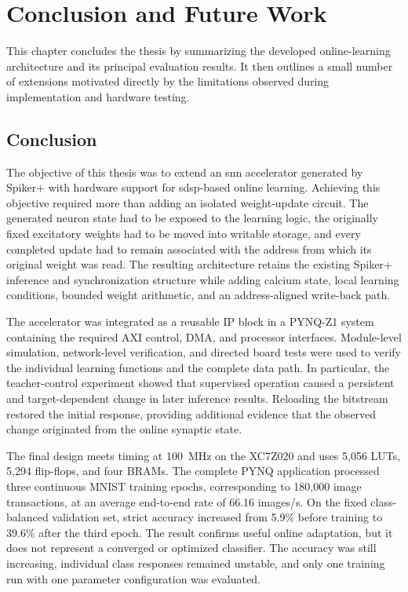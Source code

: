 \chapter{Conclusion and Future Work}
\label{sec:conclusion_and_future_work}

This chapter concludes the thesis by summarizing the developed online-learning architecture and its principal evaluation results. It then outlines a small number of extensions motivated directly by the limitations observed during implementation and hardware testing.

\section{Conclusion}

The objective of this thesis was to extend an \gls{snn} accelerator generated by Spiker+ with hardware support for \gls{sdsp}-based online learning. Achieving this objective required more than adding an isolated weight-update circuit. The generated neuron state had to be exposed to the learning logic, the originally fixed excitatory weights had to be moved into writable storage, and every completed update had to remain associated with the address from which its original weight was read. The resulting architecture retains the existing Spiker+ inference and synchronization structure while adding calcium state, local learning conditions, bounded weight arithmetic, and an address-aligned write-back path.

The accelerator was integrated as a reusable IP block in a PYNQ-Z1 system containing the required AXI control, DMA, and processor interfaces. Module-level simulation, network-level verification, and directed board tests were used to verify the individual learning functions and the complete data path. In particular, the teacher-control experiment showed that supervised operation caused a persistent and target-dependent change in later inference results. Reloading the bitstream restored the initial response, providing additional evidence that the observed change originated from the online synaptic state.

The final design meets timing at 100~MHz on the XC7Z020 and uses 5,056 LUTs, 5,294 flip-flops, and four BRAMs. The complete PYNQ application processed three continuous MNIST training epochs, corresponding to 180,000 image transactions, at an average end-to-end rate of 66.16 images/s. On the fixed class-balanced validation set, strict accuracy increased from 5.9\% before training to 39.6\% after the third epoch. The result confirms useful online adaptation, but it does not represent a converged or optimized classifier. The accuracy was still increasing, individual class responses remained unstable, and only one training run with one parameter configuration was evaluated.


